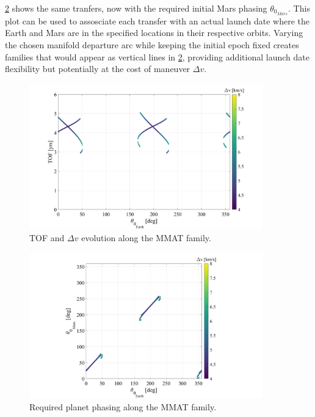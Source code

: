 \cref{fig:MMATtheta} shows the same tranfers, now with the required initial Mars phasing
$\theta_{0_{Mars}}$. This plot can be used to assosciate each transfer with an actual launch date
where the Earth and Mars are in the specified locations in their respective orbits. Varying the
chosen manifold departure arc while keeping the initial epoch fixed creates families that would
appear as vertical lines in \cref{fig:MMATtheta}, providing additional launch date flexibility but
potentially at the cost of maneuver $\Delta v$.

\begin{figure}[ht]
    \centering
    \includegraphics[width=0.9\textwidth]{figures/MMATTOF.pdf}
    \caption{TOF and $\Delta v$ evolution along the MMAT family.}
    \label{fig:MMATTOF}
\end{figure}

\begin{figure}[ht]
    \centering
    \includegraphics[width=0.9\textwidth]{figures/MMATtheta.pdf}
    \caption{Required planet phasing along the MMAT family.}
    \label{fig:MMATtheta}
\end{figure}
